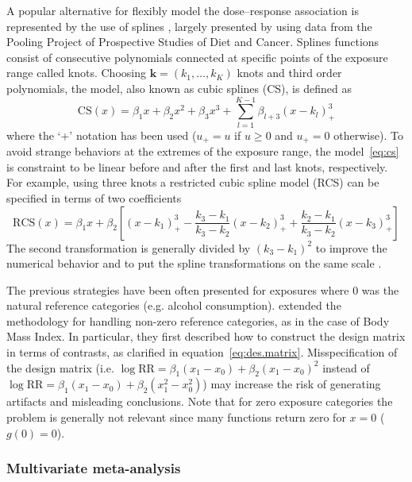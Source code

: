 \documentclass[11pt,a4paper,twoside,openany]{book}\usepackage{knitr}
\begin{document}
{A popular alternative for flexibly model the dose--response association is represented by the use of splines \citep{de1978practical}, largely presented by \cite{orsini2011meta} using data from the Pooling Project of Prospective Studies of Diet and Cancer. Splines functions consist of consecutive polynomials connected at specific points of the exposure range called knots. Choosing $\mathbf{k} = \left(k_1, \dots, k_K\right)$ knots and third order polynomials, the model, also known as cubic splines (CS), is defined as
\begin{equation}
\mathrm{CS}(x) = \beta_1 x + \beta_2x^2 + \beta_3x^3 + \sum_{l = 1}^{K-1} \beta_{l+3}(x - k_l)_{+}^3
\label{eq:cs}
\end{equation}
\noindent where the `+' notation has been used ($u_+ = u$ if $u \ge 0$ and $u_+ = 0$ otherwise). To avoid strange behaviors at the extremes of the exposure range, the model~\ref{eq:cs} is constraint to be linear before and after the first and last knots, respectively. For example, using three knots a restricted cubic spline model (RCS) can be specified in terms of two coefficients
\begin{equation}
\mathrm{RCS}(x) = \beta_1 x + \beta_2 \left[ \left( x - k_1 \right)_{+}^3 - \frac{k_3 - k_1}{k_3 - k_2} \left( x - k_2  \right)_{+}^3 + \frac{k_2 - k_1}{k_3 - k_2} \left(x - k_3 \right)_{+}^3\right]
\label{eq:rcs}
\end{equation}
\noindent The second transformation is generally divided by $(k_3 - k_1)^2$ to improve the numerical behavior and to put the spline transformations on the same scale \citep{harrell2015regression}.

The previous strategies have been often presented for exposures where 0 was the natural reference categories (e.g. alcohol consumption). \cite{liu2009two} extended the methodology for handling non-zero reference categories, as in the case of Body Mass Index. In particular, they first described how to construct the design matrix in terms of contrasts, as clarified in equation~\ref{eq:des.matrix}. Misspecification of the design matrix (i.e. $\log \mathrm{RR} = \beta_1 (x_1 - x_0) + \beta_2 (x_1 - x_0)^2$ instead of $\log \mathrm{RR} = \beta_1 (x_1 - x_0) + \beta_2 (x_1^2 - x_0^2)$) may increase the risk of generating artifacts and misleading conclusions. Note that for zero exposure categories the problem is generally not relevant since many functions return zero for $x = 0$ ($g(0) = 0$).

\subsubsection*{Multivariate meta-analysis}

}
\end{document}
